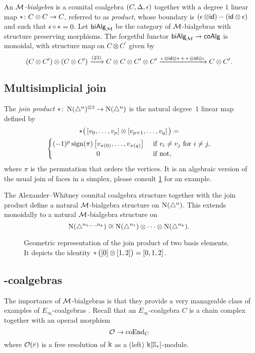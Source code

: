 An \textit{$\mathcal{M}$-bialgebra} is a counital coalgebra $(C, \operatorname{\Delta}, \operatorname{\epsilon})$ together with a degree $1$ linear map $\operatorname{\ast} \colon C \otimes C \to C$, referred to as \textit{product}, whose boundary is $(\operatorname{\epsilon} \otimes \mathsf{id}) - (\mathsf{id} \otimes \operatorname{\epsilon})$ and such that $\operatorname{\epsilon} \circ \operatorname{\ast} = 0$.
Let $\mathsf{biAlg}_{\mathcal{M}}$ be the category of $\mathcal{M}$-bialgebras with structure preserving morphisms.
The forgetful functor $\mathsf{biAlg}_{\mathcal{M}} \to \mathsf{coAlg}$ is monoidal, with structure map on $C \otimes C^\prime$ given by
\[
(C \otimes C^\prime) \otimes (C \otimes C^\prime) \xrightarrow{(23)}
C \otimes C \otimes C^\prime \otimes C^\prime
\xrightarrow{\operatorname{\epsilon} \otimes \mathsf{id} \otimes \operatorname{\ast} + \operatorname{\ast} \otimes \mathsf{id} \otimes \operatorname{\epsilon}}
C \otimes C^\prime.
\]

\subsection{Multisimplicial join}

The \textit{join product} $\ast \colon \operatorname{N}(\triangle^n)^{\otimes 2} \to \operatorname{N}(\triangle^n)$ is the natural degree~$1$ linear map defined by
\begin{multline}
\ast \big(\left[v_0, \dots, v_p \right] \ot \left[v_{p+1}, \dots, v_q\right]\big) = \\
\begin{cases} (-1)^{p} \sign(\pi) \left[v_{\pi(0)}, \dots, v_{\pi(q)}\right] & \text{ if } v_i \neq v_j \text{ for } i \neq j, \\
\hfil 0 & \text{ if not}, \end{cases}
\end{multline}
where $\pi$ is the permutation that orders the vertices.
It is an algebraic version of the usual join of faces in a simplex, please consult \cref{f:join of faces} for an example.

The Alexander--Whitney counital coalgebra structure together with the join product define a natural $\mathcal{M}$-bialgebra structure on $\operatorname{N}(\triangle^n)$. This extends monoidally to a natural $\mathcal{M}$-bialgebra structure on
\[
\operatorname{N}(\triangle^{n_1, \dots, n_k}) \cong
\operatorname{N}(\triangle^{n_1}) \otimes \dotsb \otimes \operatorname{N}(\triangle^{n_k}).
\]

\begin{figure}
	
	\caption{Geometric representation of the join product of two basis elements. It depicts the identity $\operatorname{\ast} \big( [0] \otimes [1,2] \big) = [0,1,2]$.}
	\label{f:join of faces}
\end{figure}

\subsection{\pdfEinfty-coalgebras}

The importance of $\mathcal{M}$-bialgebras is that they provide a very manageable class of examples of $E_\infty$-coalgebras \cite{medina2020prop1}.
Recall that an $E_\infty$-coalgebra $C$ is a chain complex together with an operad morphism
\[
\mathcal{O} \to \mathrm{coEnd}_C
\]
where $\mathcal{O}(r)$ is a free resolution of $\Bbbk$ as a (left) $\Bbbk[\mathbb{S}_r]$-module.